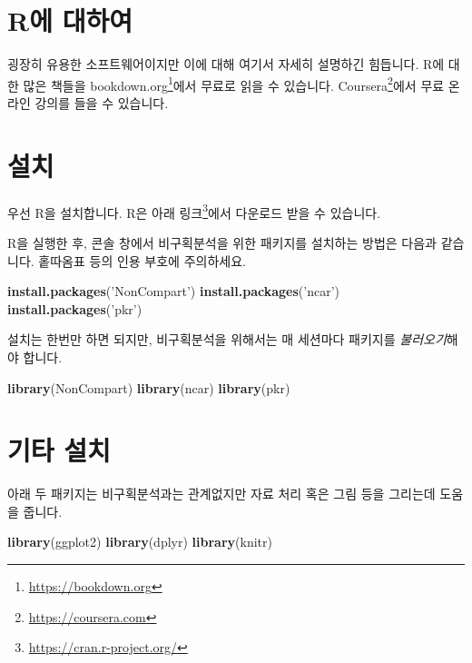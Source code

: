 \documentclass[12pt,]{krantz}
\newenvironment{Shaded}{\begin{snugshade}}{\end{snugshade}}
\newcommand{\KeywordTok}[1]{\textcolor[rgb]{0.13,0.29,0.53}{\textbf{#1}}}
\newcommand{\NormalTok}[1]{#1}
\newcommand{\StringTok}[1]{\textcolor[rgb]{0.31,0.60,0.02}{#1}}
\let\rmarkdownfootnote\footnote%
\def\footnote{\protect\rmarkdownfootnote}
\begin{document}
\hypertarget{basic}{%
\section{R에 대하여}\label{basic}}

굉장히 유용한 소프트웨어이지만 이에 대해 여기서 자세히 설명하긴 힘듭니다.
R에 대한 많은 책들을 bookdown.org\footnote{\url{https://bookdown.org}}에서 무료로 읽을 수 있습니다.
Coursera\footnote{\url{https://coursera.com}}에서 무료 온라인 강의를 들을 수 있습니다.

\hypertarget{install}{%
\section{설치}\label{install}}

우선 R을 설치합니다.
R은 아래 링크\footnote{\url{https://cran.r-project.org/}}에서 다운로드 받을 수 있습니다.

R을 실행한 후, 콘솔 창에서 비구획분석을 위한 패키지를 설치하는 방법은 다음과 같습니다.
홑따옴표 등의 인용 부호에 주의하세요.

\begin{Shaded}
\begin{Highlighting}[]
\KeywordTok{install.packages}\NormalTok{(}\StringTok{'NonCompart'}\NormalTok{)}
\KeywordTok{install.packages}\NormalTok{(}\StringTok{'ncar'}\NormalTok{)}
\KeywordTok{install.packages}\NormalTok{(}\StringTok{'pkr'}\NormalTok{)}
\end{Highlighting}
\end{Shaded}

설치는 한번만 하면 되지만, 비구획분석을 위해서는 매 세션마다 패키지를 \emph{불러오기}해야 합니다.

\begin{Shaded}
\begin{Highlighting}[]
\KeywordTok{library}\NormalTok{(NonCompart)}
\KeywordTok{library}\NormalTok{(ncar)}
\KeywordTok{library}\NormalTok{(pkr)}
\end{Highlighting}
\end{Shaded}

\hypertarget{otherinstall}{%
\section{기타 설치}\label{otherinstall}}

아래 두 패키지는 비구획분석과는 관계없지만 자료 처리 혹은 그림 등을 그리는데 도움을 줍니다.

\begin{Shaded}
\begin{Highlighting}[]
\KeywordTok{library}\NormalTok{(ggplot2) }
\KeywordTok{library}\NormalTok{(dplyr) }
\KeywordTok{library}\NormalTok{(knitr) }
\end{Highlighting}
\end{Shaded}
\end{document}
